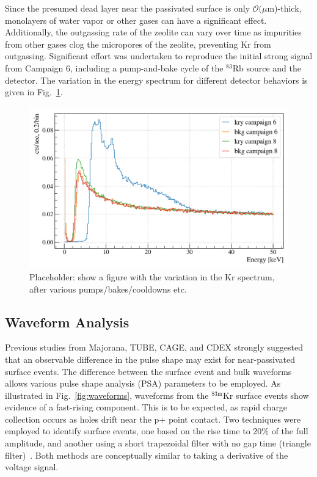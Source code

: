 \documentclass[nofootinbib,superscriptaddress, aps, prc, 
10pt, amsmath, amssymb, bibnotes,
altaffilletter, twocolumn, floatfix]{revtex4-2}
\def\MJ{{\sc Majorana}}
\def\kr83{{${}^{83\mathrm{m}}$Kr}}
\begin{document}
    Since the presumed dead layer near the passivated surface is only $\mathcal{O}(\mu$m)-thick, monolayers of water vapor or other gases can have a significant effect.
    Additionally, the outgassing rate of the zeolite can vary over time as impurities from other gases clog the micropores of the zeolite, preventing Kr from outgassing. 
    Significant effort was undertaken to reproduce the initial strong signal from Campaign 6, including a pump-and-bake cycle of the $^{83}$Rb source and the detector.
    The variation in the energy spectrum for different detector behaviors is given in Fig.~\ref{fig:variation}.
    
    \begin{figure}
        \includegraphics[width=\columnwidth]{krstc_spectrum_variation.png}
        \caption{Placeholder: show a figure with the variation in the Kr spectrum, after various pumps/bakes/cooldowns etc.}
        \label{fig:variation}
    \end{figure}

\subsection{Waveform Analysis}

    Previous studies from \MJ, TUBE, CAGE, and CDEX strongly suggested that an observable difference in the pulse shape may exist for near-passivated surface events.
    The difference between the surface event and bulk waveforms allows various pulse shape analysis (PSA) parameters to be employed.
    As illustrated in Fig.~\ref{fig:waveforms}, waveforms from the \kr83 surface events show evidence of a fast-rising component. This is to be expected, as rapid charge collection occurs as holes drift near the p+ point contact.
    Two techniques were employed to identify surface events, one based on the rise time to 20\% of the full amplitude, and another using a short trapezoidal filter with no gap time (triangle filter)~\cite{knoll2010radiation}.
    Both methods are conceptually similar to taking a derivative of the voltage signal.   
    
\end{document}
